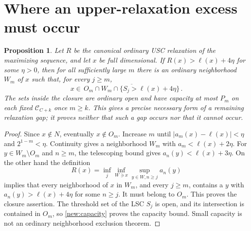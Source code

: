 \documentclass[11pt]{article}
\newtheorem{proposition}[theorem]{Proposition}
\newcommand{\C}{\mathcal C}
\begin{document}
\section{Where an upper-relaxation excess must occur}
\begin{proposition}\label{new:spikes}
Let $R$ be the canonical ordinary USC relaxation of the maximizing
sequence, and let $x$ be full dimensional. If
$R(x)>\ell(x)+4\eta$ for some $\eta>0$, then for all sufficiently
large $m$ there is an ordinary neighborhood $W_m$ of $x$ such that,
for every $j\ge m$,
\[
 x\in\overline{\,O_m\cap W_m\cap
                  \{S_j>\ell(x)+4\eta\}\,}.
\]
The sets inside the closure are ordinary open and have capacity at
most $P_m$ on each fixed $\C_{C+k}$ once $m\ge k$.
This gives a precise necessary form of a remaining relaxation gap;
it proves neither that such a gap occurs nor that it cannot occur.
\end{proposition}
\begin{proof}
Since $x\notin N$, eventually $x\notin O_m$. Increase $m$ until
$|a_m(x)-\ell(x)|<\eta$ and $2^{1-m}<\eta$.
Continuity gives a neighborhood $W_m$ with
$a_m<\ell(x)+2\eta$. For $y\in W_m\setminus O_m$ and $n\ge m$,
the telescoping bound gives $a_n(y)<\ell(x)+3\eta$.
On the other hand the definition
\[
 R(x)=\inf_j\inf_{W\ni x}\sup_{y\in W,n\ge j}a_n(y)
\]
implies that every neighborhood of $x$ in $W_m$, and every $j\ge m$,
contains a $y$ with $a_n(y)>\ell(x)+4\eta$ for some $n\ge j$.
It must belong to $O_m$. This proves the closure assertion.
The threshold set of the LSC $S_j$ is open, and its intersection is
contained in $O_m$, so \eqref{new:capacity} proves the capacity bound.
Small capacity is not an ordinary neighborhood exclusion theorem.
\end{proof}
\end{document}
